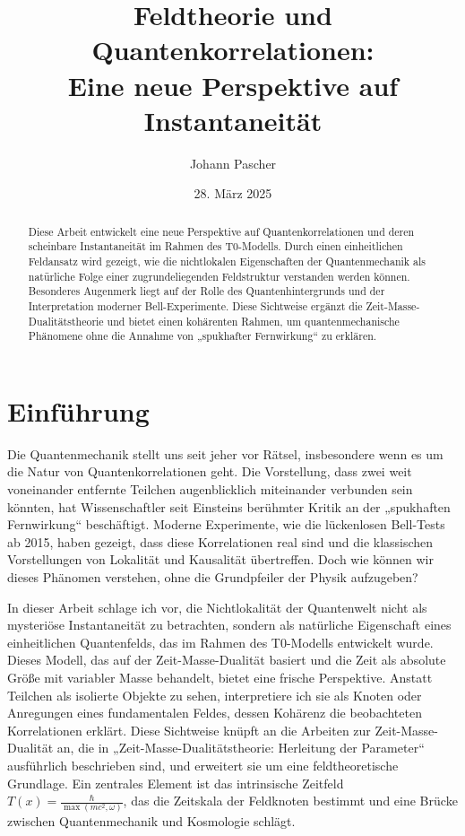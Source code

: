 \documentclass[a4paper,12pt]{article}
\title{Feldtheorie und Quantenkorrelationen: \\Eine neue Perspektive auf Instantaneität}
\author{Johann Pascher}
\date{28. März 2025}
\newcommand{\Tfield}{T(x)}
\theoremstyle{definition}
\theoremstyle{remark}
\begin{document}
	
	\maketitle
	
	\begin{abstract}
		Diese Arbeit entwickelt eine neue Perspektive auf Quantenkorrelationen und deren scheinbare Instantaneität im Rahmen des T0-Modells. Durch einen einheitlichen Feldansatz wird gezeigt, wie die nichtlokalen Eigenschaften der Quantenmechanik als natürliche Folge einer zugrundeliegenden Feldstruktur verstanden werden können. Besonderes Augenmerk liegt auf der Rolle des Quantenhintergrunds und der Interpretation moderner Bell-Experimente. Diese Sichtweise ergänzt die Zeit-Masse-Dualitätstheorie und bietet einen kohärenten Rahmen, um quantenmechanische Phänomene ohne die Annahme von „spukhafter Fernwirkung“ zu erklären.
	\end{abstract}
	
	\tableofcontents
	\newpage
	
	\section{Einführung}
	
	Die Quantenmechanik stellt uns seit jeher vor Rätsel, insbesondere wenn es um die Natur von Quantenkorrelationen geht. Die Vorstellung, dass zwei weit voneinander entfernte Teilchen augenblicklich miteinander verbunden sein könnten, hat Wissenschaftler seit Einsteins berühmter Kritik an der „spukhaften Fernwirkung“ beschäftigt. Moderne Experimente, wie die lückenlosen Bell-Tests ab 2015, haben gezeigt, dass diese Korrelationen real sind und die klassischen Vorstellungen von Lokalität und Kausalität übertreffen. Doch wie können wir dieses Phänomen verstehen, ohne die Grundpfeiler der Physik aufzugeben?
	
	In dieser Arbeit schlage ich vor, die Nichtlokalität der Quantenwelt nicht als mysteriöse Instantaneität zu betrachten, sondern als natürliche Eigenschaft eines einheitlichen Quantenfelds, das im Rahmen des T0-Modells entwickelt wurde. Dieses Modell, das auf der Zeit-Masse-Dualität basiert und die Zeit als absolute Größe mit variabler Masse behandelt, bietet eine frische Perspektive. Anstatt Teilchen als isolierte Objekte zu sehen, interpretiere ich sie als Knoten oder Anregungen eines fundamentalen Feldes, dessen Kohärenz die beobachteten Korrelationen erklärt. Diese Sichtweise knüpft an die Arbeiten zur Zeit-Masse-Dualität an, die in „Zeit-Masse-Dualitätstheorie: Herleitung der Parameter“ \cite{pascher_params_2025} ausführlich beschrieben sind, und erweitert sie um eine feldtheoretische Grundlage. Ein zentrales Element ist das intrinsische Zeitfeld \(\Tfield = \frac{\hbar}{\max(m c^2, \omega)}\), das die Zeitskala der Feldknoten bestimmt und eine Brücke zwischen Quantenmechanik und Kosmologie schlägt.
	
\end{document}

